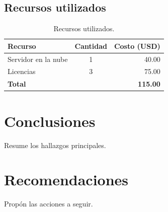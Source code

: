\documentclass[11pt,a4paper]{article}
\begin{document}
\subsection{Recursos utilizados}
\begin{table}[htbp]
  \centering
  \caption{Recursos utilizados.}
  \begin{tabular}{lcr}
    \toprule
    Recurso & Cantidad & Costo (USD) \\
    \midrule
    Servidor en la nube & 1 & 40.00 \\
    Licencias & 3 & 75.00 \\
    \midrule
    \textbf{Total} & & \textbf{115.00} \\
    \bottomrule
  \end{tabular}
\end{table}

\section{Conclusiones}
Resume los hallazgos principales.

\section{Recomendaciones}
Propón las acciones a seguir.
\end{document}
